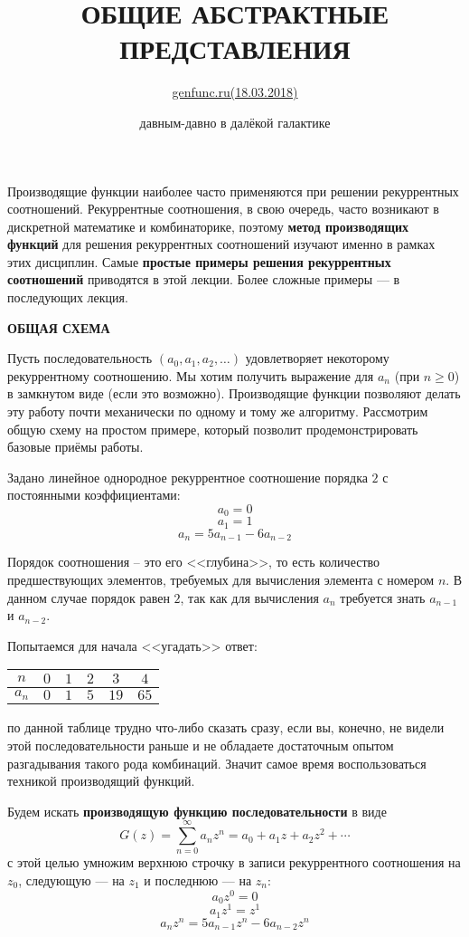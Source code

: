 \documentclass[12pt, letterpaper]{extarticle}
\title{\textbf{ОБЩИЕ АБСТРАКТНЫЕ ПРЕДСТАВЛЕНИЯ}}
\author{\href{https://web.archive.org/web/20170629072301/http://www.genfunc.ru/theory/rsol/}{genfunc.ru(18.03.2018)}}
\date{давным-давно в далёкой галактике}
\begin{document}
\maketitle
Производящие функции наиболее часто применяются при решении рекуррентных соотношений. Рекуррентные соотношения, в свою очередь, часто возникают в дискретной математике и комбинаторике, поэтому \textbf{метод производящих функций} для решения рекуррентных соотношений изучают именно в рамках этих дисциплин. Самые \textbf{простые примеры решения рекуррентных соотношений} приводятся в этой лекции. Более сложные примеры — в последующих лекция.
\begin{center}
  \textbf{ОБЩАЯ СХЕМА}
\end{center}

Пусть последовательность $(a_0, a_1, a_2, \dots)$ удовлетворяет некоторому рекуррентному соотношению. Мы хотим получить выражение для $a_n$ (при $n\geq0$) в замкнутом виде (если это возможно). Производящие функции позволяют делать эту работу почти механически по одному и тому же алгоритму. Рассмотрим общую схему на простом примере, который позволит продемонстрировать базовые приёмы работы.

Задано линейное однородное рекуррентное соотношение порядка $2$ с постоянными коэффициентами:
\[a_0=0\]
\[a_1=1\]
\[a_n=5a_{n-1}-6a_{n-2}\]

Порядок соотношения -- это его <<глубина>>, то есть количество предшествующих элементов, требуемых для вычисления элемента с номером $n$. В данном случае порядок равен $2$, так как для вычисления $a_n$ требуется знать $a_{n-1}$ и $a_{n-2}$.

Попытаемся для начала <<угадать>> ответ:

\begin{center}
  \begin{tabular}{| c | c | c | c | c | c |}
    \hline
    $n$ & $0$ & $1$ & $2$ & $3$ & $4$ \\
    \hline
    $a_n$ & $0$ & $1$ & $5$ & $19$ & $65$\\
    \hline
  \end{tabular}
\end{center}

по данной таблице трудно что-либо сказать сразу, если вы, конечно, не видели этой последовательности раньше и не обладаете достаточным опытом разгадывания такого рода комбинаций. Значит самое время воспользоваться техникой производящий функций.

Будем искать \textbf{производящую функцию последовательности} в виде
\[G(z)=\sum_{n=0}^{\infty}a_nz^n=a_0+a_1z+a_2z^2+\cdots\]
с этой целью умножим верхнюю строчку в записи рекуррентного соотношения на $z_0$, следующую — на $z_1$ и последнюю — на $z_n$:
\[a_0z^0=0\]
\[a_1z^1=z^1\]
\[a_nz^n=5a_{n-1}z^n-6a_{n-2}z^n\]
\end{document}
